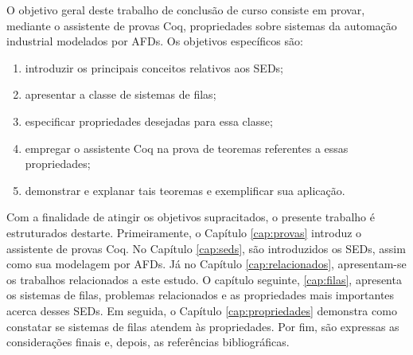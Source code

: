 O objetivo geral deste trabalho de conclusão de curso consiste em provar, mediante o assistente de provas Coq, propriedades sobre sistemas da automação industrial modelados por AFDs. Os objetivos específicos são: \begin{enumerate}
	\item introduzir os principais conceitos relativos aos SEDs;
	\item apresentar a classe de sistemas de filas;
	\item especificar propriedades desejadas para essa classe;
	\item empregar o assistente Coq na prova de teoremas referentes a essas propriedades;
	\item demonstrar e explanar tais teoremas e exemplificar sua aplicação.
\end{enumerate}

Com a finalidade de atingir os objetivos supracitados, o presente trabalho é estruturados destarte. Primeiramente, o Capítulo \ref{cap:provas} introduz o assistente de provas Coq. No Capítulo \ref{cap:seds}, são introduzidos os SEDs, assim como sua modelagem por AFDs. Já no Capítulo \ref{cap:relacionados}, apresentam-se os trabalhos relacionados a este estudo. O capítulo seguinte, \ref{cap:filas}, apresenta os sistemas de filas, problemas relacionados e as propriedades mais importantes acerca desses SEDs. Em seguida, o Capítulo \ref{cap:propriedades} demonstra como constatar se sistemas de filas atendem às propriedades. Por fim, são expressas as considerações finais e, depois, as referências bibliográficas.